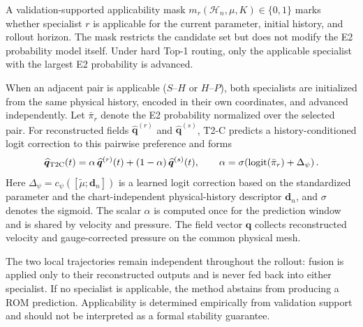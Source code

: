 A validation-supported applicability mask $m_r(\mathcal H_n,\mu,K)\in\{0,1\}$ marks whether specialist $r$ is applicable for the current parameter, initial history, and rollout horizon. The mask restricts the candidate set but does not modify the E2 probability
model itself. Under hard Top-1 routing, only the applicable specialist with the largest E2 probability is advanced.

When an adjacent pair is applicable ($S$--$H$ or $H$--$P$), both specialists are initialized from the same physical history, encoded in
their own coordinates, and advanced independently. Let $\bar\pi_r$ denote the E2 probability normalized over the selected pair. For reconstructed fields $\widehat{\bm q}^{(r)}$ and $\widehat{\bm q}^{(s)}$, T2-C predicts a history-conditioned logit correction to this pairwise preference and forms
\begin{equation}
  \widehat{\bm q}_{\rm T2C}(t)
  =\alpha\,\widehat{\bm q}^{(r)}(t)
  +(1-\alpha)\,\widehat{\bm q}^{(s)}(t),
  \qquad
  \alpha=
  \sigma\!\left(
  \operatorname{logit}(\bar\pi_r)+\Delta_\psi
  \right).
  \label{eq:main_t2c}
\end{equation}
Here $\Delta_\psi=c_\psi([\widetilde\mu;\bm d_n])$ is a learned logit correction based on the standardized parameter and the chart-independent physical-history descriptor $\bm d_n$, and $\sigma$ denotes the sigmoid. The scalar $\alpha$ is computed once for the prediction window and is shared by velocity and pressure. The field vector $\bm q$ collects reconstructed velocity and gauge-corrected pressure on the common physical mesh.

The two local trajectories remain independent throughout the rollout: fusion is applied only to their reconstructed outputs and is never fed back into either specialist. If no specialist is applicable, the method abstains from producing a ROM prediction. Applicability is determined empirically from validation support and should not be interpreted as a formal stability guarantee.
